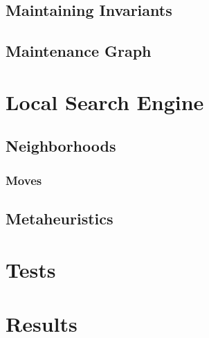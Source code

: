 \documentclass[a4paper,10pt]{article}
\begin{document}
  \subsection{Maintaining Invariants}
  \subsection{Maintenance Graph}
\section{Local Search Engine}
  \subsection{Neighborhoods}
    \subsubsection{Moves}
  \subsection{Metaheuristics}
\section{Tests}
\section{Results}
\end{document}
